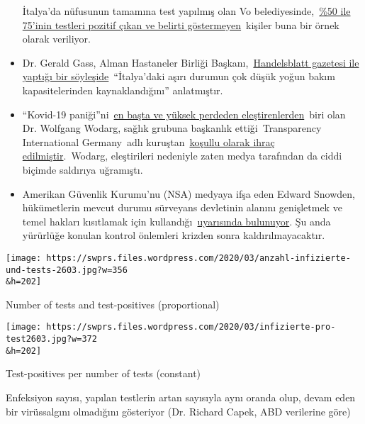 \begin{itemize}
  İtalya'da nüfusunun tamamına test yapılmış olan Vo
  belediyesinde,~\href{https://www.repubblica.it/salute/medicina-e-ricerca/2020/03/16/news/coronavirus_studio_il_50-75_dei_casi_a_vo_sono_asintomatici_e_molto_contagiosi-251474302/}{\%50
  ile 75'inin testleri pozitif çıkan ve belirti göstermeyen}~kişiler
  buna bir örnek olarak veriliyor.
\item
  Dr. Gerald Gass, Alman Hastaneler Birliği
  Başkanı,~\href{https://www.handelsblatt.com/politik/deutschland/coronakrise-deutsche-krankenhausgesellschaft-wir-sind-besser-vorbereitet-als-italien/25651268.html}{Handelsblatt
  gazetesi ile yaptığı bir söyleşide}~``İtalya'daki aşırı durumun çok
  düşük yoğun bakım kapasitelerinden kaynaklandığını'' anlatmıştır.
\item
  ``Kovid-19
  paniği''ni~\href{https://www.youtube.com/watch?v=p_AyuhbnPOI}{en başta
  ve yüksek perdeden eleştirenlerden}~biri olan Dr. Wolfgang Wodarg,
  sağlık grubuna başkanlık ettiği~Transparency International
  Germany~adlı
  kuruştan~\href{https://www.transparency.de/aktuelles/detail/article/in-eigener-sache-vorstand-beschliesst-ruhen-der-mitgliedschaft-von-wolfgang-wodarg-1/}{koşullu
  olarak ihraç edilmiştir}.~Wodarg, eleştirileri nedeniyle zaten medya
  tarafından da ciddi biçimde saldırıya uğramıştı.
\item
  Amerikan Güvenlik Kurumu'nu (NSA) medyaya ifşa eden Edward Snowden,
  hükümetlerin mevcut durumu sürveyans devletinin alanını genişletmek ve
  temel hakları kısıtlamak için
  kullandığı~\href{https://www.cnet.com/news/snowden-warns-government-surveillance-amid-covid-19-could-be-long-lasting/}{uyarısında
  bulunuyor}. Şu anda yürürlüğe konulan kontrol önlemleri krizden sonra
  kaldırılmayacaktır.
\end{itemize}

\href{https://swprs.org/a-swiss-doctor-on-covid-19/anzahl-infizierte-und-tests-2603/}{}

\texttt{[image: https://swprs.files.wordpress.com/2020/03/anzahl-infizierte-und-tests-2603.jpg?w=356\\\&h=202]}

Number of tests and test-positives (proportional)

\href{https://swprs.org/covid-19-hinweis-ii/infizierte-pro-test2603/}{}

\texttt{[image: https://swprs.files.wordpress.com/2020/03/infizierte-pro-test2603.jpg?w=372\\\&h=202]}

Test-positives per number of tests (constant)

Enfeksiyon sayısı, yapılan testlerin artan sayısıyla aynı oranda olup,
devam eden bir virüssalgını olmadığını gösteriyor (Dr. Richard Capek,
ABD verilerine göre)

